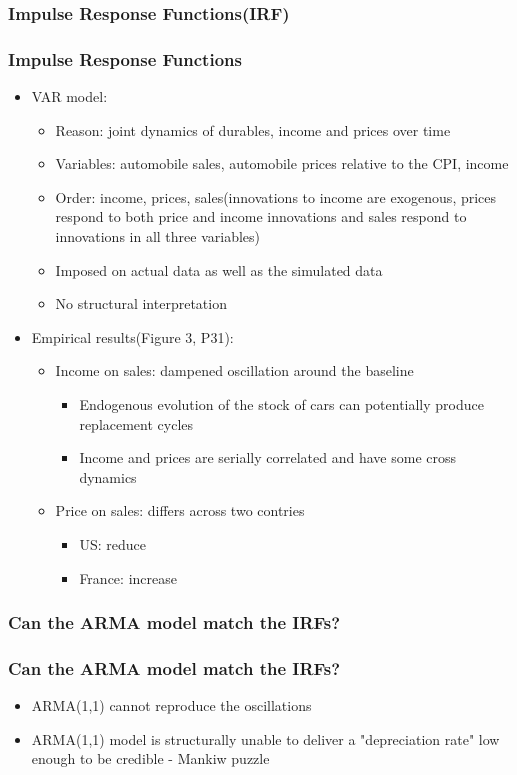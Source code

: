 \documentclass{beamer}
\begin{document}
\subsubsection{Impulse Response Functions(IRF)}
\begin{frame}
\frametitle{Impulse Response Functions}
\begin{itemize}
\item VAR model:
  \begin{itemize}
  \item Reason: joint dynamics of durables, income and prices over time
  \item Variables: automobile sales, automobile prices relative to the CPI,
income
  \item Order: income, prices, sales(innovations to income are exogenous, prices
respond to both price and income innovations and sales respond to innovations in all three variables) %
  \item Imposed on actual data as well as the simulated data %
  \item No structural interpretation
  \end{itemize}
\item Empirical results(Figure 3, P31):
  \begin{itemize}
  \item Income on sales: dampened oscillation around the baseline
    \begin{itemize}
    \item Endogenous evolution of the stock of cars can potentially produce replacement cycles
    \item Income and prices are serially correlated and have some cross dynamics
    \end{itemize}
  \item Price on sales: differs across two contries
    \begin{itemize}
    \item US: reduce
    \item France: increase
    \end{itemize}
  \end{itemize}
\end{itemize}
\end{frame}

\subsubsection{Can the ARMA model match the IRFs?}
\begin{frame}
\frametitle{Can the ARMA model match the IRFs?}
\begin{itemize}
\item ARMA(1,1) cannot reproduce the oscillations %
\item ARMA(1,1) model is structurally unable to deliver
a "depreciation rate" low enough to be credible - Mankiw
puzzle
\end{itemize}
\end{frame}
\end{document}
